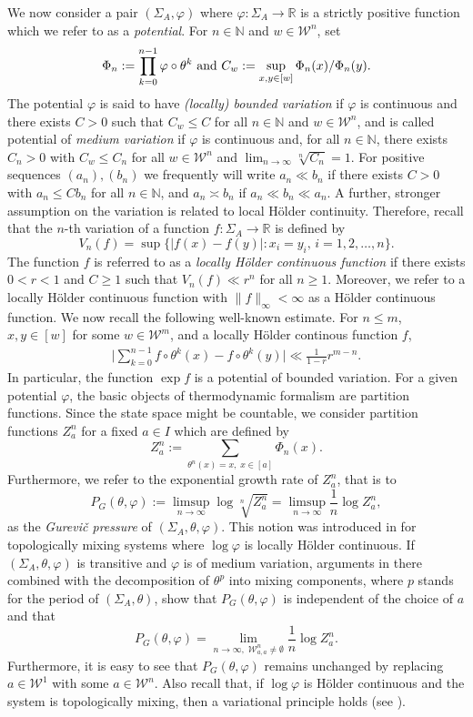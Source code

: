 \documentclass[10pt]{article}
\theoremstyle{mystyle}
\newcommand{\R}{\mathbb{R}}
\newcommand{\N}{\mathbb{N}}
\newcommand{\cW}{\mathcal{W}}
\newcommand{\te}{{\theta}}
\newcommand{\Sig}{{\Sigma}}
\newcommand{\1}{\mathbf{1}}
\begin{document}
We now consider a pair $(\Sig_A,\varphi)$ where $\varphi: \Sigma_A\to \R$ is a strictly positive function which we refer to as a \emph{potential}. For $n \in \N$ and $w \in \cW^n$, set 
\begin{equation}\label{def:bounded_distortion}
\Phi_n := \prod_{k=0}^{n-1} \varphi \circ \te^k \hbox{ and } C_w:= \sup_{x,y \in [w]} \Phi_n(x)/\Phi_n(y).\end{equation}
The potential  $\varphi$ is said to have \emph{(locally) bounded variation} if $\varphi$ is continuous and there exists $C>0$ such that  $C_w\leq C$ for all $n \in \N$ and $w \in \cW^n$, and is called potential of \emph{medium variation} if $\varphi$ is continuous and, for all $n \in \N$, there exists $C_n>0$ with  $C_w\leq C_n$ for all $w \in \cW^n$ and $ \lim_{n\to \infty} \sqrt[n]{C_n} =1$. 
For positive sequences $(a_n),(b_n)$ we frequently will write $a_n \ll b_n$ if there exists $C>0$ with $a_n \leq C b_n$ for all $n \in \N$, and $a_n \asymp b_n$ if $a_n \ll b_n \ll a_n$. 
A further, stronger assumption on the variation is related to local Hölder continuity. Therefore, recall that the $n$-th variation of a function $f: \Sig_A \to \R$ is defined by
\[V_n(f)=\sup\{ |f(x)-f(y)|: x_i=y_i,\, i=1,2,\ldots,n \}.\]
The function $f$ is referred to as a \emph{locally H\" older continuous function} if there exists
$0<r<1$ and $C\geq 1$ such that $V_n(f)\ll r^n$ for all $n\geq 1$. Moreover, we refer to a locally H\" older continuous function with $\|f\|_\infty < \infty$ as a H\" older continuous function. We now recall the following well-known estimate.
For $n \leq m$, $x,y \in [w]$ for some $w \in \cW^m$, and a locally Hölder continous function $f$,  
\begin{align} \label{eq:Hoelder_estimate}
\big|\sum_{k=0}^{n-1} f\circ \te^k(x) - f\circ \te^k(y) \big| 
\ll  \frac{1}{1-r} r^{m-n}. 
\end{align}
In particular, the function $\exp f$ is a potential of bounded variation. For a given potential $\varphi$, the basic objects of thermodynamic formalism are partition functions. Since the state space might be countable, we consider partition functions $Z_a^n$ for a fixed $a \in I$ which are  defined by
\[Z_a^n := \sum_{ \te^n(x) =x,\; x \in [a]} \Phi_n(x).\]
Furthermore, we refer to the exponential growth rate of $Z_a^n$, that is to 
\[P_G(\te,\varphi) :=  \limsup_{n \to \infty} \log \sqrt[n]{Z_a^n} = \limsup_{n \to \infty} \frac{1}{n} \log {Z_a^n},\]
as the \emph{Gurevi\v{c} pressure} of $(\Sig_A,\te,\varphi)$. This notion was introduced in \cite{Sarig:1999} for topologically mixing systems where $\log \varphi$ is locally Hölder continuous. 
If $(\Sig_A,\te,\varphi)$ is transitive and $\varphi$ is of medium variation, arguments in there combined with the decomposition of $\te^p$ into mixing components, where  $p$ stands for the period of $(\Sig_A,\te)$, show that $P_G(\te,\varphi)$ is independent of the choice of $a$ and that 
\[P_G(\te,\varphi)=\lim_{n\to \infty,\; \cW^n_{a,a} \neq \emptyset}\frac{1}{n} \log {Z_a^{n}}.\]
Furthermore, it is easy to see that $P_G(\te,\varphi)$ remains unchanged by replacing $a \in \cW^1$ with some  $a \in \cW^n$. 
Also recall that, if $\log \varphi$ is Hölder continuous and the system is topologically mixing, then a variational principle holds (see \cite{Sarig:1999}). 
\end{document}
